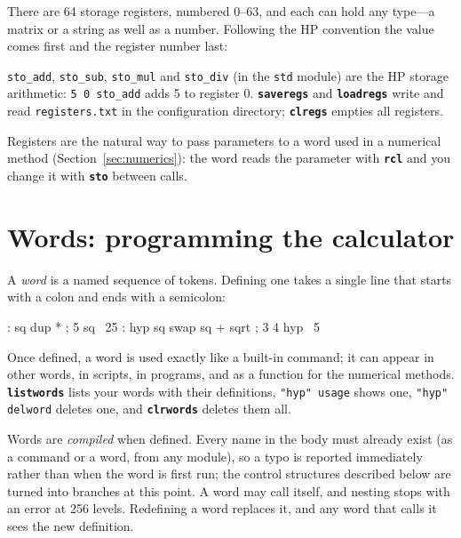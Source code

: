 \documentclass[11pt,letterpaper]{article}
\newcommand{\code}[1]{\texttt{#1}}
\newcommand{\cmd}[1]{\texttt{\textbf{#1}}}
\begin{document}
There are 64 storage registers, numbered 0--63, and each can hold any type---a matrix or a string as well as a number. Following the HP convention the value comes first and the register number last:
\code{sto\_add}, \code{sto\_sub}, \code{sto\_mul} and \code{sto\_div} (in the \code{std} module) are the HP storage arithmetic: \code{5 0 sto\_add} adds 5 to register 0. \cmd{saveregs} and \cmd{loadregs} write and read \code{registers.txt} in the configuration directory; \cmd{clregs} empties all registers.

Registers are the natural way to pass parameters to a word used in a numerical method (Section~\ref{sec:numerics}): the word reads the parameter with \cmd{rcl} and you change it with \cmd{sto} between calls.

\section{Words: programming the calculator}
\label{sec:words}

A \emph{word} is a named sequence of tokens. Defining one takes a single line that starts with a colon and ends with a semicolon:
\begin{rpn}
: sq dup * ;
5 sq                 \ 25
: hyp sq swap sq + sqrt ;
3 4 hyp              \ 5
\end{rpn}
Once defined, a word is used exactly like a built-in command; it can appear in other words, in scripts, in programs, and as a function for the numerical methods. \cmd{listwords} lists your words with their definitions, \code{"hyp" usage} shows one, \code{"hyp" delword} deletes one, and \cmd{clrwords} deletes them all.

Words are \emph{compiled} when defined. Every name in the body must already exist (as a command or a word, from any module), so a typo is reported immediately rather than when the word is first run; the control structures described below are turned into branches at this point. A word may call itself, and nesting stops with an error at 256 levels. Redefining a word replaces it, and any word that calls it sees the new definition.
\end{document}
